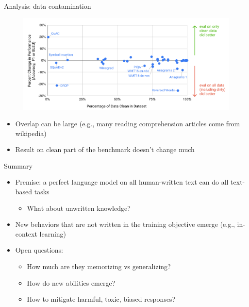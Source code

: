 \documentclass[usenames,dvipsnames,notes,11pt,aspectratio=169,hyperref={colorlinks=true, linkcolor=blue}]{beamer}
\begin{document}
\begin{frame}
    {Analysis: data contamination}
    \begin{figure}
        \includegraphics[height=0.6\textheight]{figures/gpt3-contamination}
    \end{figure}
    \begin{itemize}
        \item Overlap can be large (e.g., many reading comprehension articles come from wikipedia) 
        \item Result on clean part of the benchmark doesn't change much
    \end{itemize}
\end{frame}

\begin{frame}
    {Summary}
    \begin{itemize}
        \item Premise: a perfect language model on all human-written text can do all text-based tasks
            \begin{itemize}
                \item What about unwritten knowledge?
            \end{itemize}
        \item New behaviors that are not written in the training objective emerge (e.g., in-context learning)
        \item Open questions:
            \begin{itemize}
                \item How much are they memorizing vs generalizing?
                \item How do new abilities emerge?
                \item How to mitigate harmful, toxic, biased responses?
            \end{itemize}
    \end{itemize}
\end{frame}
\end{document}
